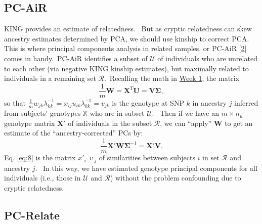 \documentclass[
]{book}
\begin{document}
\hypertarget{pc-air}{%
\subsection{PC-AiR}\label{pc-air}}

KING provides an estimate of relatedness.~ But as cryptic relatedness can skew ancestry estimates determined by PCA, we should use kinship to correct PCA.~ This is where principal components analysis in related samples, or PC-AiR {[}\protect\hyperlink{ref-conomos_robust_2015}{2}{]} comes in handy.~PC-AiR identifies a subset of \(\mathcal{U}\) of individuals who are unrelated to each other (via negative KING kinship estimates), but maximally related to individuals in a remaining set \(\mathcal{R}\).~Recalling the math in \href{}{Week 1}, the matrix\begin{equation}\frac{1}{m}\mathbf{W}=\mathbf{X}^T\mathbf{U}=\mathbf{V}\mathbf{\Sigma},\label{eq:7}\end{equation}so that \(\frac{1}{m}w_{jk}\lambda_{kk}^{-1}=x_{ij}u_{ik}\lambda_{kk}^{-1}=v_{jk}\) is the genotype at SNP \(k\) in ancestry \(j\) inferred from subjects' genotypes \(\mathbb{X}\) who are in subset \(\mathcal{U}\).~ Then if we have an \(m\times n_u\) genotype matrix \(\mathbf{X}'\) of individuals in the subset \(\mathcal{R}\), we can ``apply'' \(\mathbf{W}\) to get an estimate of the ``ancestry-corrected'' PCs by:\begin{equation}\frac{1}{m}\mathbf{X}'\mathbf{W}\mathbf{\Sigma}^{-1}=\mathbf{X}'\mathbf{V}.\label{eq:8}\end{equation}Eq. \eqref{eq:8} is the matrix \(x'_{i\cdot}v_{\cdot j}\) of similarities between subjects \(i\) in set \(\mathcal{R}\) and ancestry \(j\).~ In this way, we have estimated genotype principal components for all individuals (i.e., those in \(\mathcal{U}\) and \(\mathcal{R}\)) without the problem confounding due to cryptic relatedness.

\hypertarget{pc-relate}{%
\subsection{PC-Relate}\label{pc-relate}}
\end{document}
